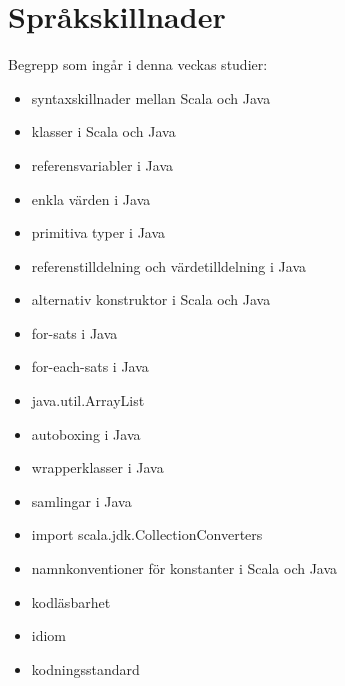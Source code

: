 \chapter{Språkskillnader}\label{chapter:W11}
Begrepp som ingår i denna veckas studier:
\begin{itemize}[noitemsep,label={$\square$},leftmargin=*]
\item syntaxskillnader mellan Scala och Java
\item klasser i Scala och Java
\item referensvariabler i Java
\item enkla värden i Java
\item primitiva typer i Java
\item referenstilldelning och värdetilldelning i Java
\item alternativ konstruktor i Scala och Java
\item for-sats i Java
\item for-each-sats i Java
\item java.util.ArrayList
\item autoboxing i Java
\item wrapperklasser i Java
\item samlingar i Java
\item import scala.jdk.CollectionConverters
\item namnkonventioner för konstanter i Scala och Java
\item kodläsbarhet
\item idiom
\item kodningsstandard\end{itemize}
